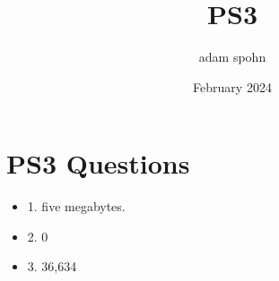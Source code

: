 \documentclass{article}
\title{PS3}
\author{adam spohn}
\date{February 2024}
\begin{document}
\maketitle

\section{PS3 Questions}

\begin {itemize}
\item 1. five megabytes.
\item 2. 0
\item 3. 36,634
\end {itemize}
\end{document}
